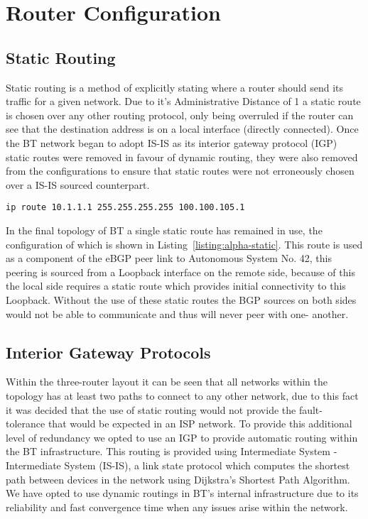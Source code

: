 \chapter{Router Configuration}
\section{Static Routing} Static routing is a
method of explicitly stating where a router should send its traffic for a given
network. Due to it's Administrative Distance of 1 a static route is chosen over
any other routing protocol, only being overruled if the router can see that the
destination address is on a local interface (directly connected). Once the BT
network began to adopt IS-IS as its interior gateway protocol (IGP) static
routes were removed in favour of dynamic routing, they were also removed from
the configurations to ensure that static routes were not erroneously chosen
over a IS-IS sourced counterpart.

\begin{lstlisting}[caption={Alpha Static Route}, label={listing:alpha-static}]
ip route 10.1.1.1 255.255.255.255 100.100.105.1
\end{lstlisting}

In the final topology of BT a single static route has remained in use, the
configuration of which is shown in Listing~\ref{listing:alpha-static}. This
route is used as a component of the eBGP peer link to Autonomous System No. 42,
this peering is sourced from a Loopback interface on the remote side, because
of this the local side requires a static route which provides initial
connectivity to this Loopback. Without the use of these static routes the BGP
sources on both sides would not be able to communicate and thus will never peer
with one- another.

\section{Interior Gateway Protocols}
Within the three-router layout it can be seen that all networks within the
topology has at least two paths to connect to any other network, due to this
fact it was decided that the use of static routing would not provide the fault-
tolerance that would be expected in an ISP network. To provide this additional
level of redundancy we opted to use an IGP to provide automatic routing within
the BT infrastructure. This routing is provided using Intermediate System -
Intermediate System (IS-IS), a link state protocol which computes the shortest
path between devices in the network using Dijkstra's Shortest Path Algorithm. We
have opted to use dynamic routings in BT's internal infrastructure due to its
reliability and fast convergence time when any issues arise within the network.

